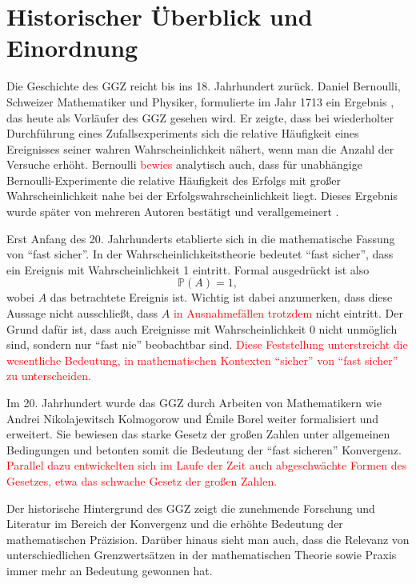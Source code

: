 \documentclass[aodsor,preprint]{imsart}
\numberwithin{equation}{section}
\theoremstyle{plain}
\begin{document}
\section{Historischer Überblick und Einordnung}
\label{sec:hist}
Die Geschichte des GGZ reicht bis ins 18. Jahrhundert zurück.
Daniel Bernoulli, Schweizer Mathematiker und Physiker, formulierte im Jahr 1713 ein Ergebnis \citep{bernoulli1713}, das heute als Vorläufer des GGZ gesehen wird.
Er zeigte, dass bei wiederholter Durchführung eines Zufallsexperiments sich die relative Häufigkeit eines Ereignisses seiner wahren Wahrscheinlichkeit nähert, wenn man die Anzahl der Versuche erhöht.
Bernoulli \textcolor{red}{bewies} analytisch auch, dass für unabhängige Bernoulli-Experimente die relative Häufigkeit des Erfolgs mit großer Wahrscheinlichkeit nahe bei der Erfolgswahrscheinlichkeit liegt.
Dieses Ergebnis wurde später von mehreren Autoren bestätigt und verallgemeinert \textcolor{red}{\citep{poisson1837theorie, chebyshev1867}}.


Erst Anfang des 20. Jahrhunderts etablierte sich in \citep{borel1909probabilites} die mathematische Fassung von \enquote{fast sicher}.
In der Wahrscheinlichkeitstheorie bedeutet \enquote{fast sicher}, dass ein Ereignis mit Wahrscheinlichkeit 1 eintritt.
Formal ausgedrückt ist also
\[\mathbb{P}(A) = 1,\]
wobei \( A \) das betrachtete Ereignis ist. Wichtig ist dabei anzumerken, dass diese Aussage nicht ausschließt, dass \( A \) \textcolor{red}{in Ausnahmefällen trotzdem} nicht eintritt. Der Grund dafür ist, dass auch Ereignisse mit Wahrscheinlichkeit 0 nicht unmöglich sind, sondern nur \enquote{fast nie} beobachtbar sind.
\textcolor{red}{Diese Feststellung unterstreicht die wesentliche Bedeutung, in mathematischen Kontexten \enquote{sicher} von \enquote{fast sicher} zu unterscheiden.}


Im 20. Jahrhundert wurde das GGZ durch Arbeiten von Mathematikern wie  Andrei Nikolajewitsch Kolmogorow und Émile Borel weiter formalisiert und erweitert.
Sie bewiesen das starke Gesetz der großen Zahlen unter allgemeinen Bedingungen und betonten somit die Bedeutung der \enquote{fast sicheren} Konvergenz.
\textcolor{red}{Parallel dazu entwickelten sich im Laufe der Zeit auch abgeschwächte Formen des Gesetzes, etwa das schwache Gesetz der großen Zahlen.}


Der historische Hintergrund des GGZ zeigt die zunehmende Forschung und Literatur im Bereich der Konvergenz und die erhöhte Bedeutung der mathematischen Präzision. Darüber hinaus sieht man auch, dass die Relevanz von unterschiedlichen Grenzwertsätzen in der mathematischen Theorie sowie Praxis immer mehr an Bedeutung gewonnen hat.
\end{document}
